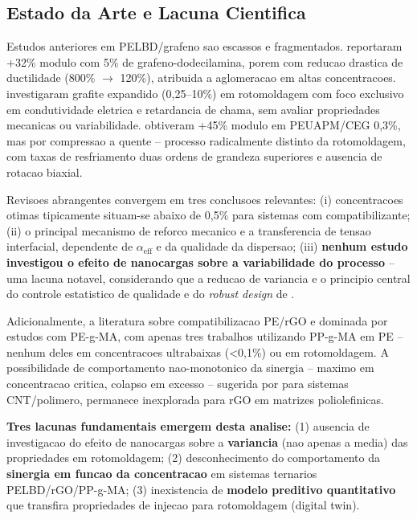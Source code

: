 \documentclass[11pt,a4paper,oneside]{article}
\begin{document}
\subsection{Estado da Arte e Lacuna Cientifica}\label{sec:lacuna}

Estudos anteriores em PELBD/grafeno sao escassos e fragmentados. \citet{Kuila2012} reportaram +32\% modulo com 5\% de grafeno-dodecilamina, porem com reducao drastica de ductilidade (800\% $\rightarrow$ 120\%), atribuida a aglomeracao em altas concentracoes. \citet{Mhike2018} investigaram grafite expandido (0,25--10\%) em rotomoldagem com foco exclusivo em condutividade eletrica e retardancia de chama, sem avaliar propriedades mecanicas ou variabilidade. \citet{Somberg2022} obtiveram +45\% modulo em PEUAPM/CEG 0,3\%, mas por compressao a quente -- processo radicalmente distinto da rotomoldagem, com taxas de resfriamento duas ordens de grandeza superiores e ausencia de rotacao biaxial.

Revisoes abrangentes \cite{Potts2011, Papageorgiou2017, Araby2020, Kumar2022} convergem em tres conclusoes relevantes: (i) concentracoes otimas tipicamente situam-se abaixo de 0,5\% para sistemas com compatibilizante; (ii) o principal mecanismo de reforco mecanico e a transferencia de tensao interfacial, dependente de $\alpha_{\text{eff}}$ e da qualidade da dispersao; (iii) {\bfseries nenhum estudo investigou o efeito de nanocargas sobre a variabilidade do processo} -- uma lacuna notavel, considerando que a reducao de variancia e o principio central do controle estatistico de qualidade \cite{Montgomery2020} e do \textit{robust design} de \citet{Taguchi1986}.

Adicionalmente, a literatura sobre compatibilizacao PE/rGO e dominada por estudos com PE-g-MA, com apenas tres trabalhos utilizando PP-g-MA em PE \cite{Lopez2021, Natarajan2020, Sanchez2018} -- nenhum deles em concentracoes ultrabaixas (<0,1\%) ou em rotomoldagem. A possibilidade de comportamento nao-monotonico da sinergia -- maximo em concentracao critica, colapso em excesso -- sugerida por \citet{Potts2011} para sistemas CNT/polimero, permanece inexplorada para rGO em matrizes poliolefinicas.

{\bfseries Tres lacunas fundamentais emergem desta analise:} (1) ausencia de investigacao do efeito de nanocargas sobre a {\bfseries variancia} (nao apenas a media) das propriedades em rotomoldagem; (2) desconhecimento do comportamento da {\bfseries sinergia em funcao da concentracao} em sistemas ternarios PELBD/rGO/PP-g-MA; (3) inexistencia de {\bfseries modelo preditivo quantitativo} que transfira propriedades de injecao para rotomoldagem (digital twin).
\end{document}
